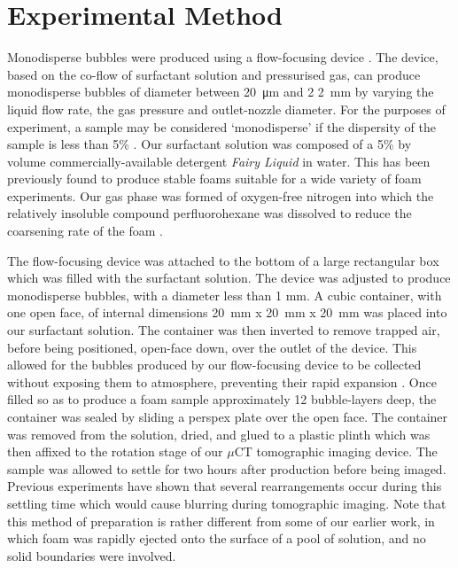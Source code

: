 \documentclass[10pt,a4paper]{article}
\begin{document}
\section{Experimental Method}

Monodisperse bubbles were produced using a flow-focusing device \cite{Ganan2004update,VanderNet06,Smith49}. The device, based on the co-flow of surfactant solution and pressurised gas, can produce monodisperse bubbles of diameter between \SI{20}{\um} and 2 \SI{2}{\mm} by varying the liquid flow rate, the gas pressure and outlet-nozzle diameter. For the purposes of experiment, a sample may be considered `monodisperse' if the dispersity of the sample is less than 5\% \cite{HohlerEtal08}.  Our surfactant solution was composed of a 5\% by volume commercially-available detergent \emph{Fairy Liquid} in water. This has been previously found to produce stable foams suitable for a wide variety of foam experiments. Our gas phase was formed of oxygen-free nitrogen into which the relatively insoluble compound perfluorohexane was dissolved to reduce the  coarsening rate of the foam \cite{WeairePageron90}.  

The flow-focusing device was attached to the bottom of a large rectangular box which was filled with the surfactant solution. The device was adjusted to produce monodisperse bubbles, with a diameter less than 1 mm. A cubic container, with one open face, of internal dimensions \SI{20}{\mm} x \SI{20}{\mm} x \SI{20}{\mm} was placed into our surfactant solution. The container was then inverted to remove trapped air, before being positioned, open-face down, over the outlet of the device. This allowed for the bubbles produced by our flow-focusing device to be collected without exposing them to atmosphere, preventing their rapid expansion \cite{FortesDeus95}. Once filled so as to produce a foam sample approximately 12 bubble-layers deep, the container was sealed by sliding a perspex plate over the open face. The container was removed from the solution, dried, and glued to a plastic plinth which was then affixed to the rotation stage of our $\mu$CT tomographic imaging device. The sample was allowed to settle for two hours after production before being imaged. Previous experiments have shown that several rearrangements occur during this settling time which would cause blurring during tomographic imaging. Note that this method of preparation is rather different from some of our earlier work, in which foam was rapidly ejected onto the surface of a pool of solution, and no solid boundaries were involved.
\end{document}

